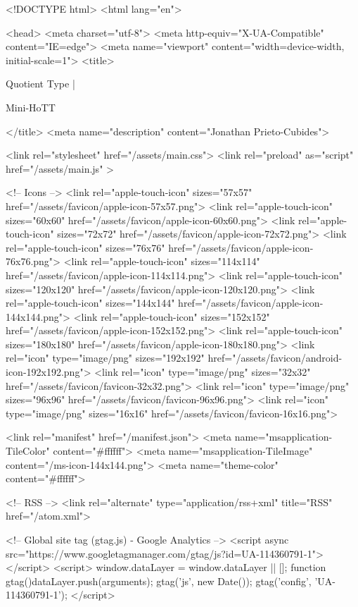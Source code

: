 <!DOCTYPE html>
<html lang="en">

<head>
  <meta charset="utf-8">
  <meta http-equiv="X-UA-Compatible" content="IE=edge">
  <meta name="viewport" content="width=device-width, initial-scale=1">
  <title>
    
      
        Quotient Type |
      
        Mini-HoTT
    
  </title>
  <meta name="description" content="Jonathan Prieto-Cubides">

  <link rel="stylesheet" href="/assets/main.css">
  <link rel="preload" as="script" href="/assets/main.js" >

  <!-- Icons -->
  <link rel="apple-touch-icon" sizes="57x57" href="/assets/favicon/apple-icon-57x57.png">
  <link rel="apple-touch-icon" sizes="60x60" href="/assets/favicon/apple-icon-60x60.png">
  <link rel="apple-touch-icon" sizes="72x72" href="/assets/favicon/apple-icon-72x72.png">
  <link rel="apple-touch-icon" sizes="76x76" href="/assets/favicon/apple-icon-76x76.png">
  <link rel="apple-touch-icon" sizes="114x114" href="/assets/favicon/apple-icon-114x114.png">
  <link rel="apple-touch-icon" sizes="120x120" href="/assets/favicon/apple-icon-120x120.png">
  <link rel="apple-touch-icon" sizes="144x144" href="/assets/favicon/apple-icon-144x144.png">
  <link rel="apple-touch-icon" sizes="152x152" href="/assets/favicon/apple-icon-152x152.png">
  <link rel="apple-touch-icon" sizes="180x180" href="/assets/favicon/apple-icon-180x180.png">
  <link rel="icon" type="image/png" sizes="192x192"  href="/assets/favicon/android-icon-192x192.png">
  <link rel="icon" type="image/png" sizes="32x32" href="/assets/favicon/favicon-32x32.png">
  <link rel="icon" type="image/png" sizes="96x96" href="/assets/favicon/favicon-96x96.png">
  <link rel="icon" type="image/png" sizes="16x16" href="/assets/favicon/favicon-16x16.png">

  <link rel="manifest" href="/manifest.json">
  <meta name="msapplication-TileColor" content="#ffffff">
  <meta name="msapplication-TileImage" content="/ms-icon-144x144.png">
  <meta name="theme-color" content="#ffffff">

  <!-- RSS -->
  <link rel="alternate" type="application/rss+xml" title="RSS" href="/atom.xml">

  <!-- Global site tag (gtag.js) - Google Analytics -->
  <script async src="https://www.googletagmanager.com/gtag/js?id=UA-114360791-1"></script>
  <script>
    window.dataLayer = window.dataLayer || [];
    function gtag(){dataLayer.push(arguments);}
    gtag('js', new Date());
    gtag('config', 'UA-114360791-1');
  </script>

